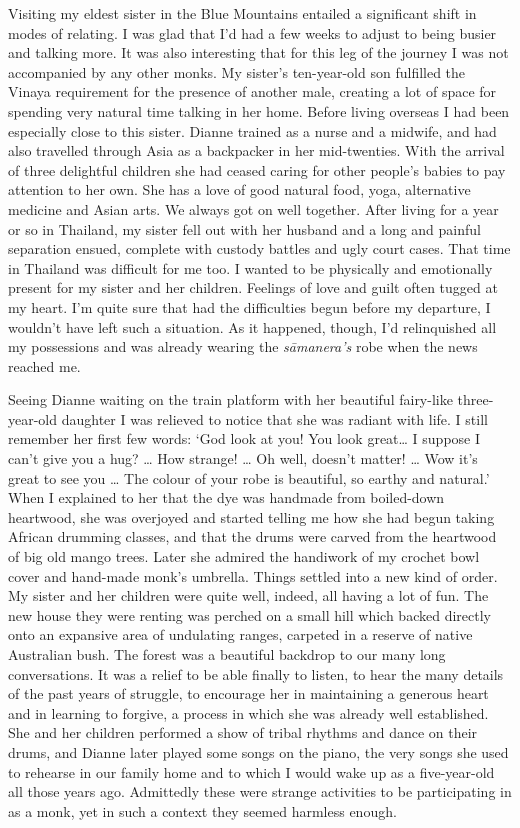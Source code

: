 Visiting my eldest sister in the Blue Mountains entailed a significant
shift in modes of relating. I was glad that I'd had a few weeks to
adjust to being busier and talking more. It was also interesting that
for this leg of the journey I was not accompanied by any other monks. My
sister's ten-year-old son fulfilled the Vinaya requirement for the
presence of another male, creating a lot of space for spending very
natural time talking in her home. Before living overseas I had been
especially close to this sister. Dianne trained as a nurse and a
midwife, and had also travelled through Asia as a backpacker in her
mid-twenties. With the arrival of three delightful children she had
ceased caring for other people's babies to pay attention to her own. She
has a love of good natural food, yoga, alternative medicine and Asian
arts. We always got on well together. After living for a year or so in
Thailand, my sister fell out with her husband and a long and painful
separation ensued, complete with custody battles and ugly court cases.
That time in Thailand was difficult for me too. I wanted to be
physically and emotionally present for my sister and her children.
Feelings of love and guilt often tugged at my heart. I'm quite sure that
had the difficulties begun before my departure, I wouldn't have left
such a situation. As it happened, though, I'd relinquished all my
possessions and was already wearing the \emph{sāmanera's} robe when the
news reached me.

Seeing Dianne waiting on the train platform with her beautiful
fairy-like three-year-old daughter I was relieved to notice that she was
radiant with life. I still remember her first few words: `God look at
you! You look great\ldots{} I suppose I can't give you a hug? \ldots{}
How strange! \ldots{} Oh well, doesn't matter! \ldots{} Wow it's great
to see you \ldots{} The colour of your robe is beautiful, so earthy and
natural.' When I explained to her that the dye was handmade from
boiled-down heartwood, she was overjoyed and started telling me how she
had begun taking African drumming classes, and that the drums were
carved from the heartwood of big old mango trees. Later she admired the
handiwork of my crochet bowl cover and hand-made monk's umbrella. Things
settled into a new kind of order. My sister and her children were quite
well, indeed, all having a lot of fun. The new house they were renting
was perched on a small hill which backed directly onto an expansive area
of undulating ranges, carpeted in a reserve of native Australian bush.
The forest was a beautiful backdrop to our many long conversations. It
was a relief to be able finally to listen, to hear the many details of
the past years of struggle, to encourage her in maintaining a generous
heart and in learning to forgive, a process in which she was already
well established. She and her children performed a show of tribal
rhythms and dance on their drums, and Dianne later played some songs on
the piano, the very songs she used to rehearse in our family home and to
which I would wake up as a five-year-old all those years ago. Admittedly
these were strange activities to be participating in as a monk, yet in
such a context they seemed harmless enough.

